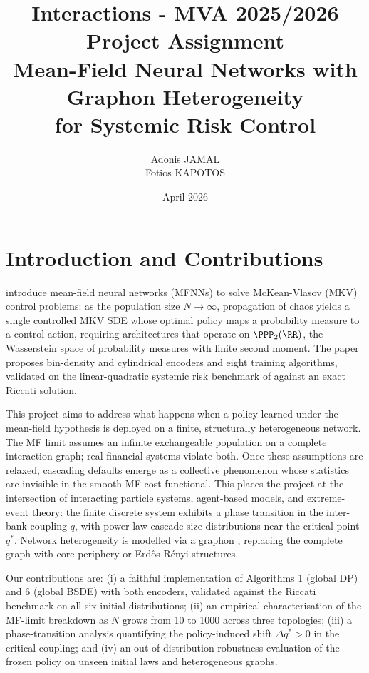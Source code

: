 \documentclass[11pt]{article}
\title{Interactions - MVA 2025/2026
      \\ \Large{Project Assignment}
      \\ \Large{Mean-Field Neural Networks with Graphon Heterogeneity \\ for Systemic Risk Control}}
\author{
Adonis JAMAL \email{adonis.jamal@student-cs.fr}\\
Fotios KAPOTOS \email{fotiskapotos@gmail.com}
}
\date{April 2026}
\begin{document}
\maketitle

\section{Introduction and Contributions}

\citet{pham2024mfnn} introduce mean-field neural networks (MFNNs) to solve McKean-Vlasov (MKV) control problems: as the population size $N \to \infty$, propagation of chaos \citep{sznitman1991propagation} yields a single controlled MKV SDE whose optimal policy maps a probability measure to a control action, requiring architectures that operate on $\PPP_2(\RR)$, the Wasserstein space of probability measures with finite second moment. The paper proposes bin-density and cylindrical encoders and eight training algorithms, validated on the linear-quadratic systemic risk benchmark of \citet{carmona2015systemic} against an exact Riccati solution.

This project aims to address what happens when a policy learned under the mean-field hypothesis is deployed on a finite, structurally heterogeneous network. The MF limit assumes an infinite exchangeable population on a complete interaction graph; real financial systems violate both. Once these assumptions are relaxed, cascading defaults emerge as a collective phenomenon whose statistics are invisible in the smooth MF cost functional. This places the project at the intersection of interacting particle systems, agent-based models, and extreme-event theory: the finite discrete system exhibits a phase transition in the inter-bank coupling $q$, with power-law cascade-size distributions near the critical point $q^*$. Network heterogeneity is modelled via a graphon \citep{lovasz2012large}, replacing the complete graph with core-periphery or Erdős-Rényi structures.

Our contributions are: (i) a faithful implementation of Algorithms 1 (global DP) and 6 (global BSDE) with both encoders, validated against the Riccati benchmark on all six initial distributions; (ii) an empirical characterisation of the MF-limit breakdown as $N$ grows from 10 to 1000 across three topologies; (iii) a phase-transition analysis quantifying the policy-induced shift $\Delta q^* > 0$ in the critical coupling; and (iv) an out-of-distribution robustness evaluation of the frozen policy on unseen initial laws and heterogeneous graphs.
\end{document}
